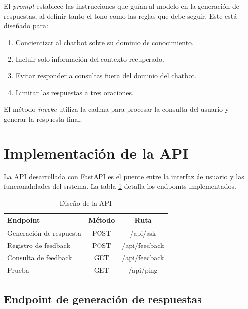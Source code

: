 El \textit{prompt} establece las instrucciones que guían al modelo en la generación de respuestas, al definir 
tanto el tono como las reglas que debe seguir. Este está diseñado para:

\begin{enumerate}
	\item Concientizar al chatbot sobre su dominio de conocimiento.
    \item Incluir solo información del contexto recuperado.
    \item Evitar responder a consultas fuera del dominio del chatbot.
    \item Limitar las respuestas a tres oraciones.
\end{enumerate}

El método \textit{invoke} utiliza la cadena para procesar la consulta del usuario y generar la respuesta final.

\section{Implementación de la API}

La API desarrollada con FastAPI es el puente entre la interfaz de usuario y las funcionalidades del sistema. La 
tabla \ref{tab:api} detalla los endpoints implementados.

\begin{table}[h]
	\centering
	\caption[Diseño de la API]{Diseño de la API}
	\begin{tabular}{l c c}    
		\toprule
		\textbf{Endpoint} 	     & \textbf{Método} 	& \textbf{Ruta}  \\
		\midrule
		Generación de respuesta  &  POST 		    & /api/ask       \\		
		Registro de feedback     &  POST		    & /api/feedback  \\
		Consulta de feedback	 &  GET             & /api/feedback  \\
		Prueba                   &  GET             & /api/ping      \\
		\bottomrule
		\hline
	\end{tabular}
	\label{tab:api}
\end{table}

\subsection{Endpoint de generación de respuestas}

